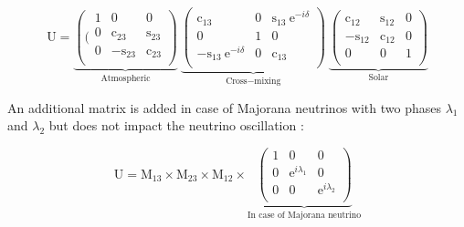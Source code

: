 \documentclass[main.tex]{subfiles}
\begin{document}
   
\begin{equation}
\text{U} = \underbrace{ \left(( \begin{array}{ccc}
\text{1} & \text{0}               & \text{0} \\
\text{0} & \text{c}_{\text{23}}   & \text{s}_{\text{23}} \\
\text{0} &  -\text{s}_{\text{23}} & \text{c}_{\text{23}} \\
\end{array} \right)}_{\text{Atmospheric}}~\underbrace{ \left( \begin{array}{ccc}
\text{c}_{\text{13}}                       & \text{0} & \text{s}_{\text{13}}~\text{e}^{-i\delta} \\
\text{0}                                  & \text{1} & \text{0}  \\
-\text{s}_{\text{13}}~\text{e}^{-i\delta} & \text{0} & \text{c}_{\text{13}} \\
\end{array} \right)}_{\text{Cross}-\text{mixing}}~\underbrace{\left( \begin{array}{ccc}
\text{c}_{\text{12}}  & \text{s}_{\text{12}} & \text{0} \\
-\text{s}_{\text{12}} & \text{c}_{\text{12}} & \text{0} \\
\text{0}              & \text{0}             & \text{1} \\     
\end{array} \right)}_{\text{Solar}}
\end{equation}


\NI An additional matrix is added in case of Majorana neutrinos with two phases $\lambda_\text{1}$ and $\lambda_\text{2}$ but does not impact the neutrino oscillation :


\begin{equation}
\text{U} = \text{M}_{\text{13}} \times \text{M}_{\text{23}} \times \text{M}_{\text{12}} \times \underbrace{ \left( \begin{array}{ccc}
\text{1}                    & \text{0}                    & \text{0} \\
\text{0}                    & \text{e}^{i\lambda_\text{1}} & \text{0} \\
\text{0}                    & \text{0}                    & \text{e}^{i\lambda_\text{2}}\\
\end{array} \right) }_{\text{In case of Majorana neutrino}}  
\end{equation} 
\end{document}
